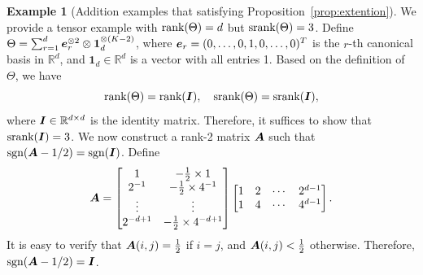 \documentclass{article}
\theoremstyle{plain}
\newtheorem{prop}{Proposition}
\theoremstyle{definition}
\newtheorem{example}{Example}
\def\sign{\textup{sgn}}
\def\srank{\textup{srank}}
\def\rank{\textup{rank}}
\begin{document}
\clearpage
\begingroup
\let\clearpage\relax 
\onecolumn 
\begin{example}[Addition examples that satisfying Proposition~\ref{prop:extention}]
We provide a tensor example with $\rank(\Theta)=d$ but $\srank(\Theta)=3$. Define $\Theta=\sum_{r=1}^d \bm{e}^{\otimes 2}_r\otimes \mathbf{1}^{\otimes (K-2)}_d$, where $\bm{e}_r=(0,\ldots,0,1,0,\ldots,0)^T$ is the $r$-th canonical basis in $\mathbb{R}^d$, and $\mathbf{1}_d\in\mathbb{R}^d$ is a vector with all entries 1. Based on the definition of $\Theta$, we have
\[
\rank(\Theta)=\rank(\mI),\quad \srank(\Theta)=\srank(\mI),
\]
where $\bm I\in\mathbb{R}^{d\times d}$ is the identity matrix. Therefore, it suffices to show that $\srank(\mI)=3$. We now construct a rank-2 matrix $\bm A$ such that $\sign(\mA-1/2)=\sign(\mI)$. Define
\[
\bm A=\begin{bmatrix}
1 & -{1\over 2}\times 1\\
2^{-1}& -{1\over 2}\times 4^{-1}\\
\vdots&\vdots\\
2^{-d+1}& -{1\over 2}\times 4^{-d+1}
\end{bmatrix}
\begin{bmatrix}
1&2&\cdots&2^{d-1}\\
1&4&\cdots& 4^{d-1}
\end{bmatrix}.
\]
It is easy to verify that $\bm A(i,j)={1\over 2}$ if $i=j$, and $\bm A(i,j)<{1\over 2}$ otherwise. Therefore, $\sign(\mA-1/2)=\mI$. 
\end{example}
\end{document}
